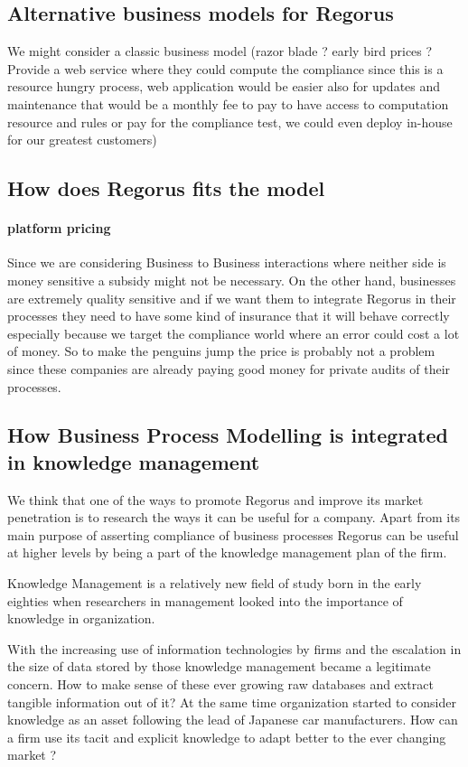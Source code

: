 \documentclass[10pt]{report}
\begin{document}
\subsection{Alternative business models for Regorus}
We might consider a classic business model (razor blade ? early bird prices ? Provide a web service where they could compute the compliance since this is a resource hungry process, web application would be easier also for updates and maintenance that would be a monthly fee to pay to have access to computation resource and rules or pay for the compliance test, we could even deploy in-house for our greatest customers)


\subsection{How does Regorus fits the model}
\paragraph{platform pricing} Since we are considering Business to Business interactions where neither side is money sensitive a subsidy might not be necessary. On the other hand, businesses are extremely quality sensitive and if we want them to integrate Regorus in their processes they need to have some kind of insurance that it will behave correctly especially because we target the compliance world where an error could cost a lot of money. So to make the penguins jump the price is probably not a problem since these companies are already paying good money for private audits of their processes.



\subsection{How Business Process Modelling is integrated in knowledge management}

We think that one of the ways to promote Regorus and improve its market penetration is to research the ways it can be useful for a company. Apart from its main purpose of asserting compliance of business processes Regorus can be useful at higher levels by being a part of the knowledge management plan of the firm.

Knowledge Management is a relatively new field of study born in the early eighties when researchers in management looked into the importance of knowledge in organization.\autocite{Wiig19971}

With the increasing use of information technologies by firms and the escalation in the size of data stored by those knowledge management became a legitimate concern. How to make sense of these ever growing raw databases and extract tangible information out of it? At the same time organization started to consider knowledge as an asset following the lead of Japanese car manufacturers.\autocite{Koenig08} How can a firm use its tacit and explicit knowledge to adapt better to the ever changing market ?
\end{document}
